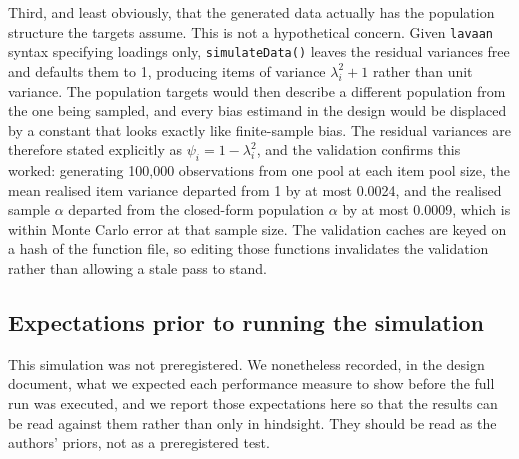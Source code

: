 \documentclass[
  nonatbib,
  authoryear,
  preprint]{elsarticle}
\begin{document}
Third, and least obviously, that the generated data actually has the
population structure the targets assume. This is not a hypothetical
concern. Given \texttt{lavaan} syntax specifying loadings only,
\texttt{simulateData()} leaves the residual variances free and defaults
them to 1, producing items of variance \(\lambda_i^2 + 1\) rather than
unit variance. The population targets would then describe a different
population from the one being sampled, and every bias estimand in the
design would be displaced by a constant that looks exactly like
finite-sample bias. The residual variances are therefore stated
explicitly as \(\psi_i = 1 - \lambda_i^2\), and the validation confirms
this worked: generating 100,000 observations from one pool at each item
pool size, the mean realised item variance departed from 1 by at most
0.0024, and the realised sample \(\alpha\) departed from the closed-form
population \(\alpha\) by at most 0.0009, which is within Monte Carlo
error at that sample size. The validation caches are keyed on a hash of
the function file, so editing those functions invalidates the validation
rather than allowing a stale pass to stand.

\subsection{Expectations prior to running the
simulation}\label{expectations-prior-to-running-the-simulation}

This simulation was not preregistered. We nonetheless recorded, in the
design document, what we expected each performance measure to show
before the full run was executed, and we report those expectations here
so that the results can be read against them rather than only in
hindsight. They should be read as the authors' priors, not as a
preregistered test.
\end{document}
